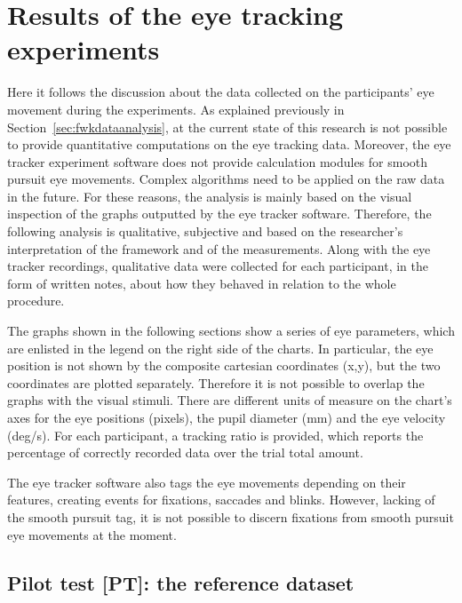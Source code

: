 \chapter{Results of the eye tracking experiments}
\label{chap:results}

Here it follows the discussion about the data collected on the participants’ eye movement during the experiments. As explained previously in Section~\ref{sec:fwkdataanalysis}, at the current state of this research is not possible to provide quantitative computations on the eye tracking data. Moreover, the eye tracker experiment software does not provide calculation modules for smooth pursuit eye movements. Complex algorithms need to be applied on the raw data in the future. For these reasons, the analysis is mainly based on the visual inspection of the graphs outputted by the eye tracker software. Therefore, the following analysis is qualitative, subjective and based on the researcher’s interpretation of the framework and of the measurements. Along with the eye tracker recordings, qualitative data were collected for each participant, in the form of written notes, about how they behaved in relation to the whole procedure.

The graphs shown in the following sections show a series of eye parameters, which are enlisted in the legend on the right side of the charts. In particular, the eye position is not shown by the composite cartesian coordinates (x,y), but the two coordinates are plotted separately. Therefore it is not possible to overlap the graphs with the visual stimuli. There are different units of measure on the chart’s axes for the eye positions (pixels), the pupil diameter (mm) and the eye velocity (deg/s). For each participant, a tracking ratio is provided, which reports the percentage of correctly recorded data over the trial total amount.

The eye tracker software also tags the eye movements depending on their features, creating events for fixations, saccades and blinks. However, lacking of the smooth pursuit tag, it is not possible to discern fixations from smooth pursuit eye movements at the moment.

\section{Pilot test [PT]: the reference dataset}
\label{sec:respilot}

